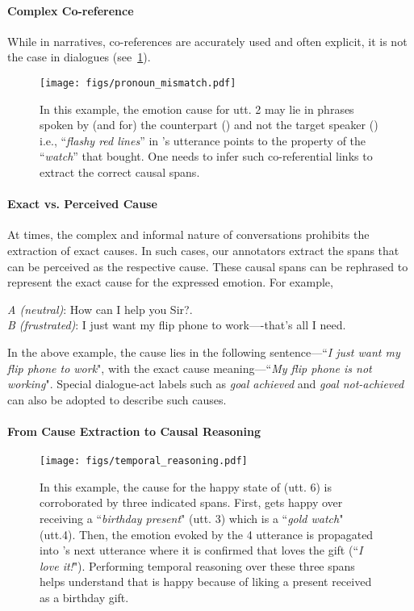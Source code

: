 \documentclass[11pt,a4paper]{article}
\theoremstyle{definition}
\begin{document}
\paragraph{Complex Co-reference} While in narratives, co-references are accurately used and often explicit, it is not the case in dialogues (see~\cref{fig:pronoun_mismatch}).  

\begin{figure}[t!]
    \centering
    \texttt{[image: figs/pronoun\_mismatch.pdf]}
    \caption{\footnotesize{In this example, the emotion cause for utt. 2 may lie in phrases spoken by (and for) the counterpart () and not the target speaker () i.e., ``\textit{flashy red lines}'' in 's utterance points to the property of the ``\textit{watch}'' that  bought. One needs to infer such co-referential links to extract the correct causal spans.}}
    \label{fig:pronoun_mismatch}
\end{figure}


\paragraph{Exact vs. Perceived Cause} At times, the complex and informal nature of conversations prohibits the extraction of exact causes. In such cases, our annotators extract the spans that can be perceived as the respective cause. These causal spans can be rephrased to represent the exact cause for the expressed emotion. For example,

\begin{exe}
\ex \textit{A (neutral)}: How can I help you Sir?.\\
\textit{B (frustrated)}: I just want my flip phone to work----that's all I need.\\
\label{ex:exact1}
\end{exe}



In the above example, the cause lies in the following sentence---``\textit{I just want my flip phone to work}", with the exact cause meaning---``\textit{My flip phone is not working}". Special dialogue-act labels such as \emph{goal achieved} and \emph{goal not-achieved} can also be adopted to describe such causes.

\paragraph{From Cause Extraction to Causal Reasoning}

\begin{figure}[t!]
    \centering
    \texttt{[image: figs/temporal\_reasoning.pdf]}
    \caption{\footnotesize{In this example, the cause for the happy state of  (utt. 6) is corroborated by three indicated spans. First,  gets happy over receiving a ``\textit{birthday present}" (utt. 3) which is a ``\textit{gold watch}" (utt.4). Then, the emotion evoked by the 4 utterance is propagated into 's next utterance where it is confirmed that  loves the gift (``\textit{I love it!}"). Performing temporal reasoning over these three spans helps understand that  is happy because of liking a present received as a birthday gift.}}
    \label{fig:temporal_reasoning}
\end{figure}
\end{document}
